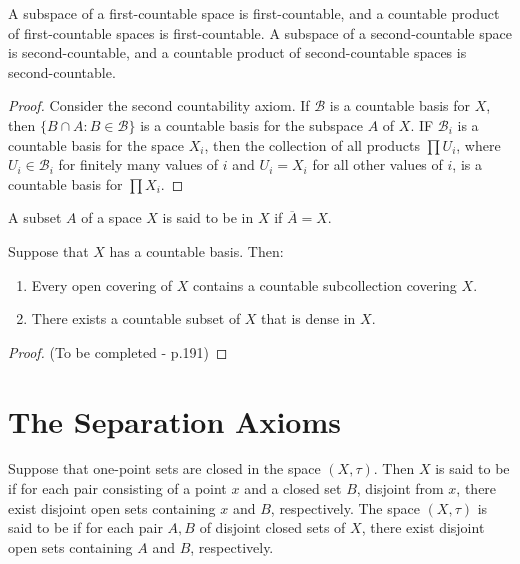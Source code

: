 \documentclass[12pt, a4paper, oneside, openright, titlepage]{book}
\begin{document}
\begin{thm}
    A subspace of a first-countable space is first-countable, and a countable product of first-countable spaces is first-countable. A subspace of a second-countable space is second-countable, and a countable product of second-countable spaces is second-countable.
\end{thm}
\begin{proof}
    Consider the second countability axiom. If $\mathcal{B}$ is a countable basis for $X$, then $\{B\cap A:B\in\mathcal{B}\}$ is a countable basis for the subspace $A$ of $X$. IF $\mathcal{B}_i$ is a countable basis for the space $X_i$, then the collection of all products $\prod U_i$, where $U_i \in \mathcal{B}_i$ for finitely many values of $i$ and $U_i = X_i$ for all other values of $i$, is a countable basis for $\prod X_i$.
\end{proof}


\begin{defn}
    A subset $A$ of a space $X$ is said to be  in $X$ if $\overline{A} = X$.
\end{defn}

\begin{thm}
    Suppose that $X$ has a countable basis. Then: \begin{enumerate}
        \item Every open covering of $X$ contains a countable subcollection covering $X$.
        \item There exists a countable subset of $X$ that is dense in $X$.
    \end{enumerate}
\end{thm}
\begin{proof}
    (To be completed - p.191)
\end{proof}

\section{The Separation Axioms}

\begin{defn}
    Suppose that one-point sets are closed in the space $(X,\tau)$. Then $X$ is said to be  if for each pair consisting of a point $x$ and a closed set $B$, disjoint from $x$, there exist disjoint open sets containing $x$ and $B$, respectively. The space $(X,\tau)$ is said to be  if for each pair $A,B$ of disjoint closed sets of $X$, there exist disjoint open sets containing $A$ and $B$, respectively.
\end{defn}
\end{document}
